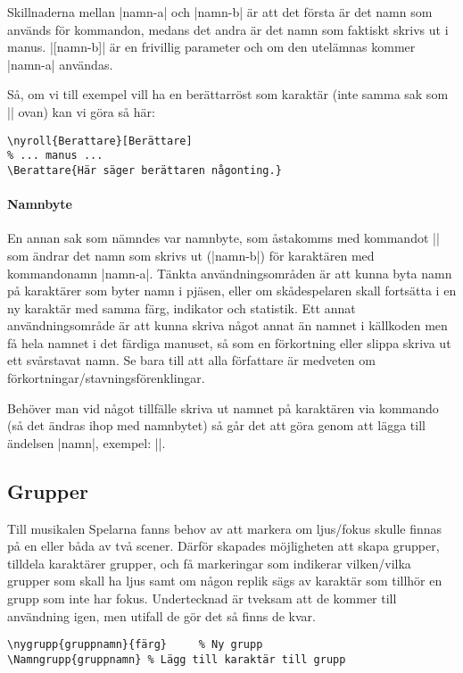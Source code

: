 \documentclass[a4paper,12pt]{article}
\begin{document}
Skillnaderna mellan |namn-a| och |namn-b| är att det första är det namn som används för kommandon, medans det andra är det namn som faktiskt skrivs ut i manus. |[namn-b]| är en frivillig parameter och om den utelämnas kommer |namn-a| användas.

Så, om vi till exempel vill ha en berättarröst som karaktär (inte samma sak som |\berattare| ovan) kan vi göra så här:

\begin{lstlisting}
\nyroll{Berattare}[Berättare]
% ... manus ...
\Berattare{Här säger berättaren någonting.}
\end{lstlisting}

\vspace{-1em}
\paragraph{Namnbyte} En annan sak som nämndes var namnbyte, som åstakomms med kommandot || som ändrar det namn som skrivs ut (|namn-b|) för karaktären med kommandonamn |namn-a|. Tänkta användningsområden är att kunna byta namn på karaktärer som byter namn i pjäsen, eller om skådespelaren skall fortsätta i en ny karaktär med samma färg, indikator och statistik. Ett annat användningsområde är att kunna skriva något annat än namnet i källkoden men få hela namnet i det färdiga manuset, så som en förkortning eller slippa skriva ut ett svårstavat namn. Se bara till att alla författare är medveten om förkortningar/stavningsförenklingar.

Behöver man vid något tillfälle skriva ut namnet på karaktären via kommando (så det ändras ihop med namnbytet) så går det att göra genom att lägga till ändelsen |namn|, exempel: |\Bobbynamn|.

\subsection{Grupper}
Till musikalen Spelarna fanns behov av att markera om ljus/fokus skulle finnas på en eller båda av två scener. Därför skapades möjligheten att skapa grupper,  tilldela karaktärer grupper, och få markeringar som indikerar vilken/vilka grupper som skall ha ljus samt om någon replik sägs av karaktär som tillhör en grupp som inte har fokus. Undertecknad är tveksam att de kommer till användning igen, men utifall de gör det så finns de kvar.

\begin{lstlisting}
\nygrupp{gruppnamn}{färg}     % Ny grupp
\Namngrupp{gruppnamn} % Lägg till karaktär till grupp
\end{lstlisting}
\end{document}
